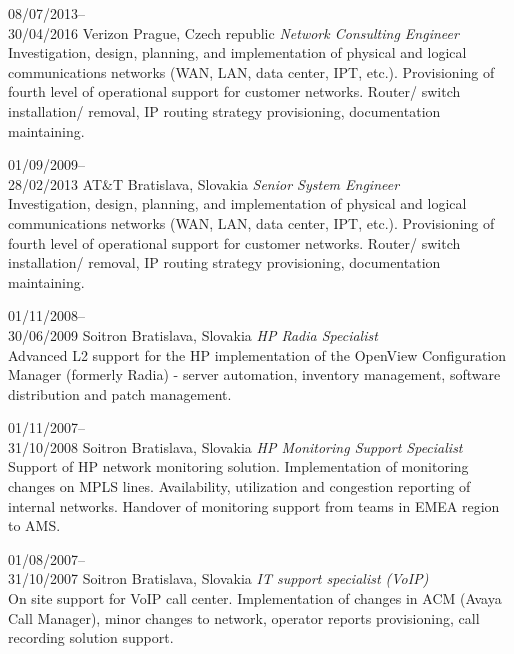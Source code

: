 \documentclass[]{friggeri-cv} %
\begin{document}
\begin{entrylist}

\entry
{08/07/2013--\\30/04/2016}
{Verizon}
{Prague, Czech republic}
{\emph{Network Consulting Engineer}\\
Investigation, design, planning, and implementation of physical and logical communications networks (WAN, LAN, data center, IPT, etc.). Provisioning of fourth level of operational support for customer networks. Router/ switch installation/ removal, IP routing strategy provisioning, documentation maintaining.
}




\entry
{01/09/2009--\\28/02/2013}
{AT\&T}
{Bratislava, Slovakia}
{\emph{Senior System Engineer}\\
Investigation, design, planning, and implementation of physical and logical communications networks (WAN, LAN, data center, IPT, etc.). Provisioning of fourth level of operational support for customer networks. Router/ switch installation/ removal, IP routing strategy provisioning, documentation maintaining.
}



\entry
{01/11/2008--\\30/06/2009}
{Soitron}
{Bratislava, Slovakia}
{\emph{HP Radia Specialist}\\
Advanced L2 support for the HP implementation of the OpenView Configuration Manager (formerly Radia) - server automation, inventory management, software distribution and patch management.
}


\entry
{01/11/2007--\\31/10/2008}
{Soitron}
{Bratislava, Slovakia}
{\emph{HP Monitoring Support Specialist}\\
Support of HP network monitoring solution. Implementation of monitoring changes on MPLS lines. Availability, utilization and congestion reporting of internal networks. Handover of monitoring support from teams in EMEA region to AMS.
}


\entry
{01/08/2007--\\31/10/2007}
{Soitron}
{Bratislava, Slovakia}
{\emph{IT support specialist (VoIP)}\\
On site support for VoIP call center. Implementation of changes in ACM (Avaya Call Manager), minor changes to network, operator reports provisioning, call recording solution support.
}
\fi

\end{entrylist}
\end{document}
